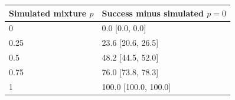 \begin{tabular}{ll}\toprule
Simulated mixture $p$ & Success minus simulated $p=0$ \\
\midrule
0 & 0.0 [0.0, 0.0] \\
0.25 & 23.6 [20.6, 26.5] \\
0.5 & 48.2 [44.5, 52.0] \\
0.75 & 76.0 [73.8, 78.3] \\
1 & 100.0 [100.0, 100.0] \\
\bottomrule\end{tabular}
